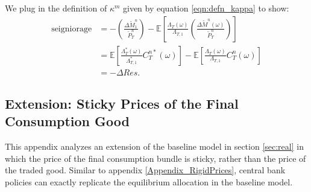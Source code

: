 We plug in the definition of $\kappa^m$ given by equation
\eqref{eqn:defn_kappa} to show:
\begin{align*}
  \text{seigniorage}
  & = - \left(\frac{\Delta \tilde{M}^n_1}{\tilde{P}^n_T}\right) - 
    \mathbb{E}\left[  
    \frac{\Lambda_T(\omega)}{\Lambda_{T, 1}}
    \left( \frac{\Delta \tilde{M}^n(\omega)}{\tilde{P}^n_T} \right)
    \right] \\
  & = \mathbb{E}\left[ \frac{\Lambda^{\ast}_T(\omega)}{\Lambda^{\ast}_{T, 1}}
    C^{n \ast}_T(\omega) \right]
    - \mathbb{E}\left[ \frac{\Lambda_T(\omega)}{\Lambda_{T, 1}} 
    C^n_T(\omega) \right] 
  \\
  & = - \Delta Res.
\end{align*}

\subsection{Extension: Sticky Prices of the Final Consumption Good
  \label{Appendix_RigidCPI}}

This appendix analyzes an extension of the baseline model in section
\ref{sec:real} in which the price of the final consumption bundle is
sticky, rather than the price of the traded good. Similar to appendix
\ref{Appendix_RigidPrices}, central bank policies can exactly
replicate the equilibrium allocation in the baseline model.

